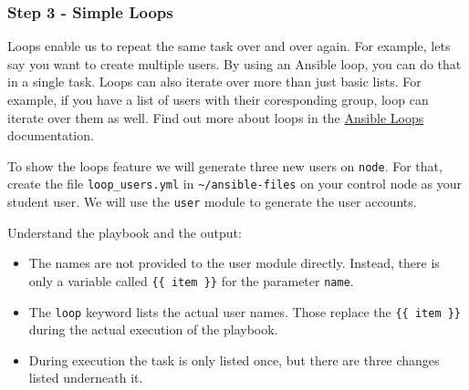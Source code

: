 \hypertarget{step-3---simple-loops}{%
\subsubsection{Step 3 - Simple Loops}\label{step-3---simple-loops}}

Loops enable us to repeat the same task over and over again. For
example, lets say you want to create multiple users. By using an Ansible
loop, you can do that in a single task. Loops can also iterate over more
than just basic lists. For example, if you have a list of users with
their coresponding group, loop can iterate over them as well. Find out
more about loops in the
\href{https://docs.ansible.com/ansible/latest/user_guide/playbooks_loops.html}{Ansible
Loops} documentation.

To show the loops feature we will generate three new users on
\texttt{node}. For that, create the file \texttt{loop\_users.yml} in
\texttt{\textasciitilde{}/ansible-files} on your control node as your
student user. We will use the \texttt{user} module to generate the user
accounts.

\begin{Shaded}
\begin{Highlighting}[]
\PreprocessorTok{{-}{-}{-}}
\KeywordTok{{-}}\AttributeTok{ }\KeywordTok{:}
\AttributeTok{  }\KeywordTok{:}
\AttributeTok{  }\KeywordTok{:}\AttributeTok{ }
\AttributeTok{  }\KeywordTok{:}
\AttributeTok{    }\KeywordTok{{-}}\AttributeTok{ }\KeywordTok{:}
\AttributeTok{      }\KeywordTok{:}
\AttributeTok{        }\KeywordTok{:}\AttributeTok{ }
\AttributeTok{        }\KeywordTok{:}
\AttributeTok{      }\KeywordTok{:}
\AttributeTok{         }\KeywordTok{{-}}
\AttributeTok{         }\KeywordTok{{-}}
\AttributeTok{         }\KeywordTok{{-}}
\end{Highlighting}
\end{Shaded}

Understand the playbook and the output:

\begin{itemize}
\tightlist
\item
  The names are not provided to the user module directly. Instead, there
  is only a variable called \texttt{\{\{\ item\ \}\}} for the parameter
  \texttt{name}.
\item
  The \texttt{loop} keyword lists the actual user names. Those replace
  the \texttt{\{\{\ item\ \}\}} during the actual execution of the
  playbook.
\item
  During execution the task is only listed once, but there are three
  changes listed underneath it.
\end{itemize}

